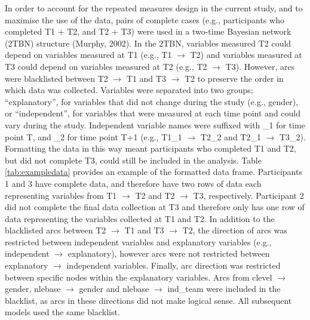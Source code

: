 \documentclass[
  english,
  man,floatsintext]{apa6}
\begin{document}
In order to account for the repeated measures design in the current study, and to maximise the use of the data, pairs of complete cases (e.g., participants who completed T1 + T2, and T2 + T3) were used in a two-time Bayesian network (2TBN) structure (Murphy, 2002).
In the 2TBN, variables measured T2 could depend on variables measured at T1 (e.g., T1 \(\rightarrow\) T2) and variables measured at T3 could depend on variables measured at T2 (e.g., T2 \(\rightarrow\) T3).
However, arcs were blacklisted between T2 \(\rightarrow\) T1 and T3 \(\rightarrow\) T2 to preserve the order in which data was collected.
Variables were separated into two groups; \enquote{explanatory}, for variables that did not change during the study (e.g., gender), or \enquote{independent}, for variables that were measured at each time point and could vary during the study.
Independent variable names were suffixed with \_1 for time point T, and \_2 for time point T+1 (e.g., T1\_1 \(\rightarrow\) T2\_2 and T2\_1 \(\rightarrow\) T3\_2).
Formatting the data in this way meant participants who completed T1 and T2, but did not complete T3, could still be included in the analysis.
Table \ref{tab:exampledata} provides an example of the formatted data frame.
Participants 1 and 3 have complete data, and therefore have two rows of data each representing variables from T1 \(\rightarrow\) T2 and T2 \(\rightarrow\) T3, respectively.
Participant 2 did not complete the final data collection at T3 and therefore only has one row of data representing the variables collected at T1 and T2.
In addition to the blacklisted arcs between T2 \(\rightarrow\) T1 and T3 \(\rightarrow\) T2, the direction of arcs was restricted between independent variables and explanatory variables (e.g., independent \(\rightarrow\) explanatory), however arcs were not restricted between explanatory \(\rightarrow\) independent variables.
Finally, arc direction was restricted between specific nodes within the explanatory variables.
Arcs from clevel \(\rightarrow\) gender, nlebase \(\rightarrow\) gender and nlebase \(\rightarrow\) ind\_team were included in the blacklist, as arcs in these directions did not make logical sense.
All subsequent models used the same blacklist.
\end{document}

